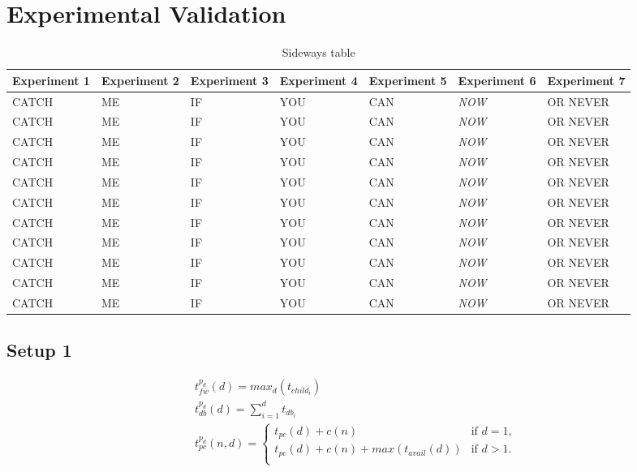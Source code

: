 \section{Experimental Validation}


\begin{table}
      \centering
      \captionsetup{type=table}
      \caption{Sideways table}
      \begin{tabular}{lllllll}\toprule
  \textbf{Experiment 1}   & \textbf{Experiment 2}  & \textbf{Experiment 3} & \textbf{Experiment 4} & \textbf{Experiment 5} & \textbf{Experiment 6} & \textbf{Experiment 7}  \\ \midrule
  CATCH & ME & IF & YOU & CAN & \emph{NOW} & OR NEVER \\
  CATCH & ME & IF & YOU & CAN & \emph{NOW} & OR NEVER \\
  CATCH & ME & IF & YOU & CAN & \emph{NOW} & OR NEVER \\
  CATCH & ME & IF & YOU & CAN & \emph{NOW} & OR NEVER \\
  CATCH & ME & IF & YOU & CAN & \emph{NOW} & OR NEVER \\
  CATCH & ME & IF & YOU & CAN & \emph{NOW} & OR NEVER \\
  CATCH & ME & IF & YOU & CAN & \emph{NOW} & OR NEVER \\
  CATCH & ME & IF & YOU & CAN & \emph{NOW} & OR NEVER \\
  CATCH & ME & IF & YOU & CAN & \emph{NOW} & OR NEVER \\
  CATCH & ME & IF & YOU & CAN & \emph{NOW} & OR NEVER \\
  CATCH & ME & IF & YOU & CAN & \emph{NOW} & OR NEVER \\
  \bottomrule
      \end{tabular}\label{tbl:eval:experiments}
\end{table}


\subsection{Setup 1}



\small
\begin{equation}
  \begin{array}{l}
    \displaystyle t^{p_d}_{fw}(d) = max_{d}(t_{child_{i}}) \\
    \displaystyle t^{p_d}_{db}(d) = \sum_{i=1}^{d} t_{db_{i}} \\
    \displaystyle t^{p_d}_{pc}(n,d) =
    	\begin{cases}
        	t_{pc}(d) + c(n) & \text{if $d = 1$,}\\
        	t_{pc}(d) + c(n) + max(t_{avail}(d)) & \text{if $d>1$.}\\
        \end{cases}
  \end{array}\label{eq:var_idb}
\end{equation}
\normalsize

